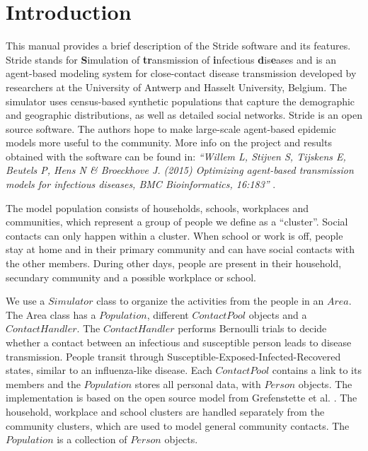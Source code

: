 \chapter{Introduction}
\label{chap:Introduction}
  
This manual provides a brief description of the Stride software and its
features. 
Stride stands for \textbf{S}imulation of \textbf{tr}ansmission 
 of \textbf{i}nfectious \textbf{d}is\textbf{e}ases and is an agent-based modeling 
system for close-contact disease transmission developed by researchers at the
University of Antwerp and Hasselt University, Belgium.
The simulator uses census-based synthetic populations
that capture the demographic and geographic distributions, as well as detailed social networks.
Stride is an open source software. The authors hope to make large-scale
agent-based epidemic models more useful to the community.
More info on the project and results obtained with the software
can be found in: 
\textit{``Willem L, Stijven S, Tijskens E, Beutels P, Hens N \& Broeckhove J. (2015) Optimizing agent-based transmission models for infectious diseases, BMC Bioinformatics, 16:183''} \cite{willem2015}.

The model population consists of households, schools, workplaces and
communities, which represent a group of people we define as a ``cluster''.
Social contacts can only happen within a cluster. 
When school or work is off, people stay at home and in their primary
community and can have social contacts with the other members.
During other days, people are present in their household, secundary community
and a possible workplace or school.  



We use a $Simulator$ class to organize the activities from the people in an $Area$. 
The Area class has a $Population$, different $ContactPool$ objects and a $Contact
Handler$.
The $Contact Handler$ performs Bernoulli trials to decide whether a contact
between an infectious and susceptible person leads to disease transmission. 
People transit through Susceptible-Exposed-Infected-Recovered states,
similar to an influenza-like disease.
Each $ContactPool$ contains a link to its members and the $Population$ stores all personal
data, with $Person$ objects.
The implementation is based on the open source model from Grefenstette et al. \cite{grefenstette2013}. 
The household, workplace and school clusters are handled separately from the
community clusters, which are used to model general community contacts. The
$Population$ is a collection of $Person$ objects.

